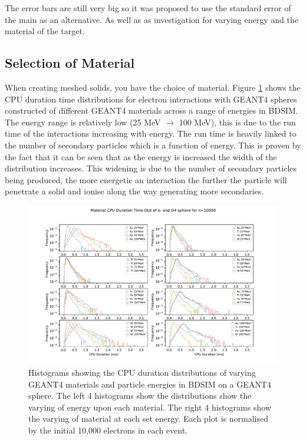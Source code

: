 \documentclass[12pt,a4paper]{article}
\begin{document}
The error bars are still very big so it was proposed to use the standard error of the main as an alternative. 
As well as as investigation for varying energy and the material of the target.

\subsection{Selection of Material}
When creating meshed solids, you have the choice of material. Figure \ref{novar} shows the CPU duration time distributions for electron interactions with GEANT4 spheres constructed of different GEANT4 materials across a range of energies in BDSIM. The energy range is relatively low (25 MeV $\rightarrow$ 100 MeV), this is due to the run time of the interactions increasing with energy. The run time is heavily linked to the number of secondary particles which is a function of energy. This is proven by the fact that it can be seen that as the energy is increased the width of the distribution increases. This widening is due to the number of secondary particles being produced, the more energetic an interaction the further the particle will penetrate a solid and ionise along the way generating more secondaries.

\begin{figure}[h!]
\centering
\includegraphics[scale=0.6]{Images//Materials//not_Varied_by_radius_and_secondaries.pdf}
\caption[width=\columnwidth]{Histograms showing the CPU duration distributions of varying GEANT4 materials and particle energies in BDSIM on a GEANT4 sphere. The left 4 histograms show the distributions show the varying of energy upon each material. The right 4 histograms show the varying of material at each set energy. Each plot is normalised by the initial 10,000 electrons in each event.}
\label{novar}
\end{figure}
\end{document}
